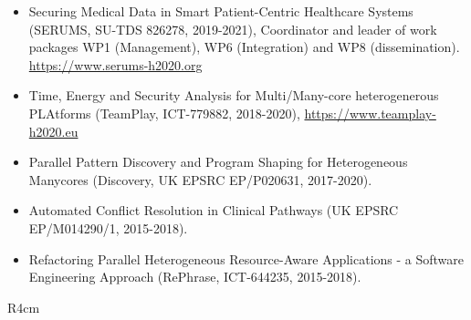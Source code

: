 \documentclass[a4paper,11pt]{article}
\begin{document}
\begin{itemize}
\item Securing Medical Data in Smart Patient-Centric Healthcare Systems (SERUMS, SU-TDS 826278, 2019-2021), Coordinator and leader of work packages WP1 (Management), WP6 (Integration) and WP8 (dissemination). \url{https://www.serums-h2020.org}
\item Time, Energy and Security Analysis for Multi/Many-core heterogenerous PLAtforms (TeamPlay, ICT-779882, 2018-2020), \url{https://www.teamplay-h2020.eu}
\item Parallel Pattern Discovery and Program Shaping for Heterogeneous Manycores (Discovery, UK EPSRC EP/P020631, 2017-2020).
\item Automated Conflict Resolution in Clinical Pathways
(UK EPSRC EP/M014290/1, 2015-2018).
\item Refactoring Parallel Heterogeneous Resource-Aware Applications - a Software Engineering Approach (RePhrase, ICT-644235, 2015-2018).


\end{itemize}

\begin{wrapfigure}{R}{4cm}
\vspace{-2cm}
\hfill {}
\vspace{-1cm}
\end{wrapfigure}
\end{document}
